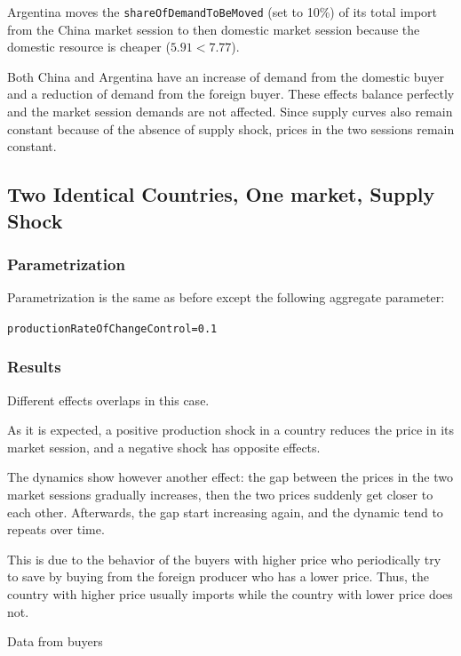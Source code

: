 \documentclass{article}
\begin{document}
Argentina moves the \verb+shareOfDemandToBeMoved+ (set to 10\%) of its total import from the China market session to then domestic market session because the domestic resource is cheaper ($5.91<7.77$).


Both China and Argentina have an increase of demand from the domestic buyer and a reduction of demand from the foreign buyer. These effects balance perfectly and the market session demands are not affected. Since supply curves also remain constant because of the absence of supply shock, prices in the two sessions remain constant.   


\subsection{Two Identical Countries, One market, Supply Shock}
\subsubsection{Parametrization}
Parametrization is the same as before except the following aggregate parameter:

\verb+productionRateOfChangeControl=0.1+

\subsubsection{Results}

Different effects overlaps in this case.

As it is expected, a positive production shock in a country reduces the price in its market session, and a negative shock has opposite effects. 

The dynamics show however another effect: the gap between the prices in the two market sessions gradually increases, then the two prices suddenly get closer to each other. Afterwards, the gap start increasing again, and the dynamic tend to repeats over time.  

This is due to the behavior of the buyers with higher price who periodically try to save by buying from the foreign producer who has a lower price. Thus, the country with higher price usually imports while the country with lower price does not.

Data from buyers
\end{document}
